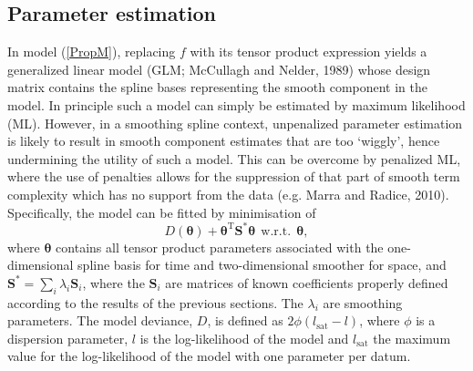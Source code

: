 \subsection{Parameter estimation \label{PE}}

In model (\ref{PropM}), replacing $f$ with its tensor product expression yields a generalized linear model (GLM; McCullagh and Nelder, 1989) whose design matrix contains the spline bases representing the smooth component in the model. In principle such a model can simply be estimated by maximum likelihood (ML). However, in a smoothing spline context, unpenalized parameter estimation is likely to result in smooth component estimates that are too `wiggly', hence undermining the utility of such a model. This can be overcome by penalized ML, where the use of penalties allows for the suppression of that part of smooth term complexity which has no support from the data (e.g. Marra and Radice, 2010). Specifically, the model can be fitted by minimisation of
\begin{equation}
D(\bm\theta) + \bm\theta^\text{T}\textbf{S}^*\bm\theta \ \  \text{w.r.t.} \ \  \bm\theta,
\label{Dev}
\end{equation}
where $\bm\theta$ contains all tensor product parameters associated with the one-dimensional spline basis for time and two-dimensional smoother for space, and $\textbf{S}^*=\sum_i \lambda_i \textbf{S}_i$, where the $\textbf{S}_i$ are matrices of known coefficients properly defined according to the results of the previous sections. The $\lambda_i$ are smoothing parameters. The model deviance, $D$, is defined as $2\phi(l_{\text{sat}}-l)$, where $\phi$ is a dispersion parameter, $l$ is the log-likelihood of the model and $l_{\text{sat}}$ the maximum value for the log-likelihood of the model with one parameter per datum. 

